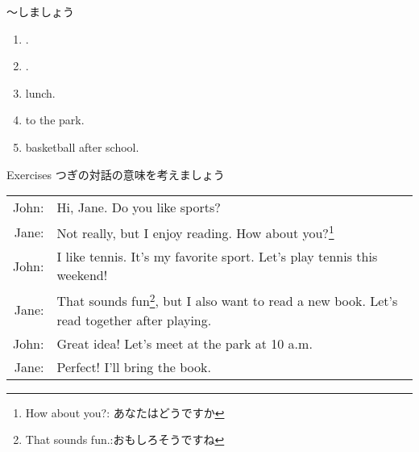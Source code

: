 \documentclass[aspectratio=169,xcolor={dvipsnames,table}]{beamer}
\begin{document}
\begin{frame}[plain]{～しましょう}
 \begin{enumerate}
  \item<1->  .
  \item<2->  .
  \item<3->   lunch. 
  \item<4->   to the park.
  \item<5->   basketball after school.
 \end{enumerate}

\end{frame}
\begin{frame}[plain]{Exercises}
つぎの対話の意味を考えましょう

\begin{tabular}{rp{}}
John:& Hi, Jane. Do you like sports?\\
Jane:& Not really, but I enjoy reading. How about you?\footnote{How about you?: あなたはどうですか}\\
John:& I like tennis. It's my favorite sport. Let's play tennis this weekend!\\
Jane:& That sounds fun\footnote{That sounds fun.:おもしろそうですね}, but I also want to read a new book. Let's read together after playing.\\
John:& Great idea! Let's meet at the park at 10 a.m.\\
Jane:& Perfect! I'll bring the book.
\end{tabular}

\end{frame}
\end{document}

